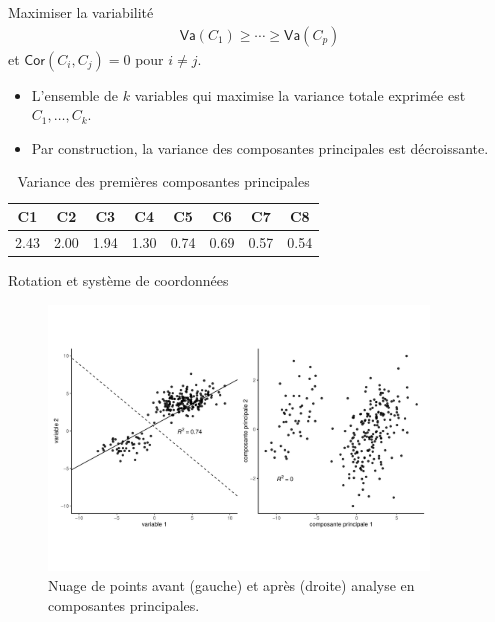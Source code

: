 \documentclass[
  ignorenonframetext,
]{beamer}
\providecommand{\tightlist}{%
  \setlength{\itemsep}{0pt}\setlength{\parskip}{0pt}}\usepackage{longtable,booktabs,array}
\begin{document}
\begin{frame}[fragile]{Maximiser la variabilité}
\protect\hypertarget{maximiser-la-variabilituxe9}{}
\begin{align*}
\mathsf{Va}(C_1) \geq \cdots \geq \mathsf{Va}(C_p)
\end{align*} et \(\mathsf{Cor}(C_i, C_j)=0\) pour \(i \neq j\).

\begin{itemize}
\tightlist
\item
  L'ensemble de \(k\) variables qui maximise la variance totale exprimée
  est \(C_1, \ldots, C_k\).
\item
  Par construction, la variance des composantes principales est
  décroissante.
\end{itemize}

\hypertarget{tbl-eigenvalues}{}
\begin{table}
\caption{\label{tbl-eigenvalues}Variance des premières composantes principales }\tabularnewline

\centering
\begin{tabular}[t]{cccccccc}
\toprule
C1 & C2 & C3 & C4 & C5 & C6 & C7 & C8\\
\midrule
2.43 & 2.00 & 1.94 & 1.30 & 0.74 & 0.69 & 0.57 & 0.54\\
\bottomrule
\end{tabular}
\end{table}
\end{frame}

\begin{frame}{Rotation et système de coordonnées}
\protect\hypertarget{rotation-et-systuxe8me-de-coordonnuxe9es}{}
\begin{figure}

{\centering \includegraphics[width=0.9\textwidth,height=\textheight]{MATH60602-diapos3_files/figure-beamer/fig-acprotation-1.pdf}

}

\caption{\label{fig-acprotation}Nuage de points avant (gauche) et après
(droite) analyse en composantes principales.}

\end{figure}
\end{frame}
\end{document}
